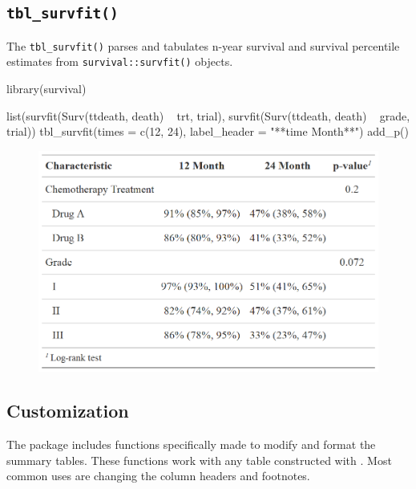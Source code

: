 \subsection{\texorpdfstring{\texttt{tbl\_survfit()}}{tbl\_survfit()}}

The \texttt{tbl\_survfit()} parses and tabulates n-year survival and survival percentile estimates from \texttt{survival::survfit()} objects.

\begin{example}
library(survival)

list(survfit(Surv(ttdeath, death) ~ trt, trial),
     survfit(Surv(ttdeath, death) ~ grade, trial)) %
  tbl_survfit(times = c(12, 24),
              label_header = "**{time} Month**") %
  add_p()
\end{example}

\begin{figure}[h!]
  \includegraphics[scale=0.28]{survfit.png}
  \centering
\end{figure}

\subsection{Customization}

The  package includes functions specifically made to modify and format the summary tables.
These functions work with any table constructed with .
Most common uses are changing the column headers and footnotes.



